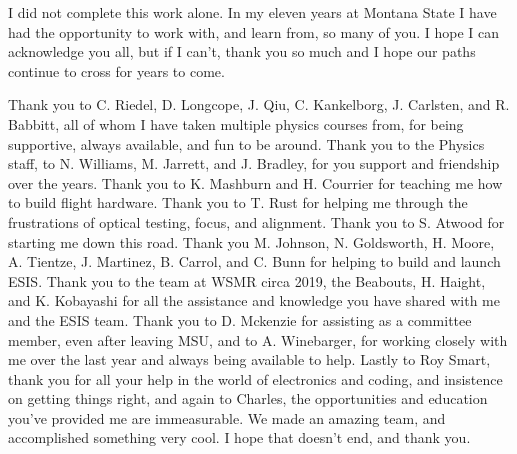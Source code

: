 
I did not complete this work alone.
In my eleven years at Montana State I have had the opportunity to work with, and learn from, so many of you.
I hope I can acknowledge you all, but if I can't, thank you so much and I hope our paths continue to cross for years to come.

Thank you to C. Riedel, D. Longcope, J. Qiu, C. Kankelborg, J. Carlsten, and R. Babbitt, all of whom I have taken multiple physics courses from, for being supportive, always available, and fun to be around.
Thank you to the Physics staff, to N. Williams, M. Jarrett, and J. Bradley, for you support and friendship over the years.
Thank you to K. Mashburn and H. Courrier for teaching me how to build flight hardware.
Thank you to T. Rust for helping me through the frustrations of optical testing, focus, and alignment.
Thank you to S. Atwood for starting me down this road.
Thank you M. Johnson, N. Goldsworth, H. Moore, A. Tientze, J. Martinez, B. Carrol, and C. Bunn for helping to build and launch ESIS.
Thank you to the team at WSMR circa 2019, the Beabouts, H. Haight, and K. Kobayashi for all the assistance and knowledge you have shared with me and the ESIS team.
Thank you to D. Mckenzie for assisting as a committee member, even after leaving MSU, and to A. Winebarger, for working closely with me over the last year and always being available to help. 
Lastly to Roy Smart, thank you for all your help in the world of electronics and coding, and insistence on getting things right, and again to Charles, the opportunities and education you've provided me are immeasurable.
We made an amazing team, and accomplished something very cool.
I hope that doesn't end, and thank you.


 
	








